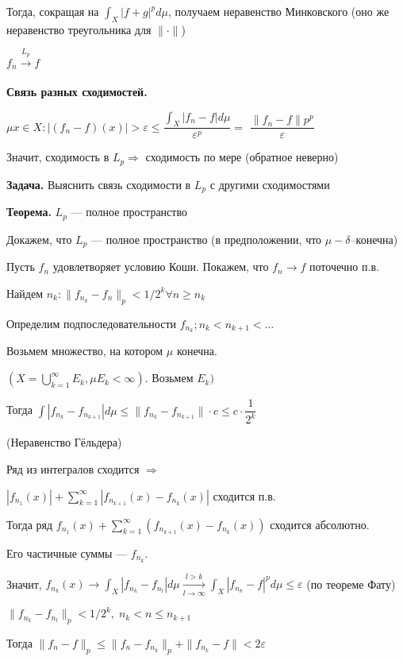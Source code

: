 Тогда, сокращая на $\int_X |f + g|^p d \mu$, получаем неравенство
Минковского (оно же неравенство треугольника для $\| \cdot \|$)

$f_n \xrightarrow[]{L_p} f$

\textbf{Связь разных сходимостей.} \quad

$\mu{x \in X: |(f_n - f)(x)| > \varepsilon} \leqslant
\dfrac{\int_X |f_n - f| d \mu}{\varepsilon^p} = $
%
%
%
%
%
%
%
%
%
%
%
$\dfrac{\|f_n - f\| p^p}{\varepsilon}$

Значит, сходимость в $L_p \Rightarrow$ сходимость по мере
(обратное неверно)

\textbf{Задача.} \quad Выяснить связь сходимости в $L_p$ с другими
сходимостями

\textbf{Теорема.} \quad $L_p$ --- полное пространство

Докажем, что $L_p$ --- полное пространство (в предположении, что
$\mu - \delta$--конечна)

Пусть $f_n$ удовлетворяет условию Коши. Покажем, что $f_n
\rightarrow f$ поточечно п.в.

Найдем $n_k : \|f_{n_k} - f_n\|_p < 1/2^k \forall n \geqslant n_k$

Определим подпоследовательности $f_{n_k}; n_k < n_{k+1} < \ldots$

Возьмем множество, на котором $\mu$ конечна.

$(X = \bigcup_{k=1}^\infty E_k, \mu E_k < \infty)$. Возьмем $E_k)$

Тогда $\int |f_{n_k} - f_{n_{k+1}}| d \mu \leqslant \|f_{n_k} -
f_{n_{k+1}}\|\cdot c \leqslant c \cdot \dfrac{1}{2^k}$

(Неравенство Гёльдера)

Ряд из интегралов сходится $\Rightarrow$

$|f_{n_1} (x)| + \sum_{k=1}^\infty |f_{n_{k+1}}(x) - f_{n_k}(x)|$
сходится п.в.

Тогда ряд $f_{n_1}(x) + \sum_{k=1}^\infty (f_{n_{k+1}}(x) -
f_{n_k}(x))$ сходится абсолютно.

Его частичные суммы --- $f_{n_k}$.

Значит, $f_{n_k}(x) \rightarrow \int_X |f_{n_k} - f_{n_l}| d \mu
\xrightarrow[l \rightarrow \infty]{l>k} \int_X |f_{n_k} - f|^p d
\mu \leqslant \varepsilon$ (по теореме Фату)

$ \| f_{n_k} - f_{n_l}\|_p < 1/2^k, \; n_k < n \leqslant n_{k+1}$

Тогда $\|f_n - f\|_p \leqslant \|f_n - f_{n_k}\|_p + \|f_{n_k} -
f\| < 2\varepsilon$
